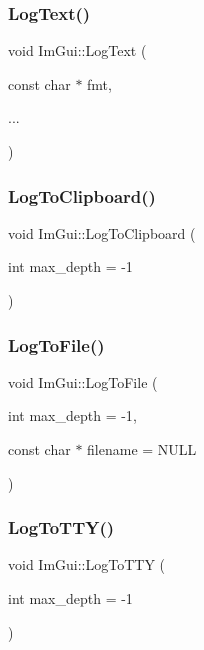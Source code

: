 \subsubsection{\texorpdfstring{Log\+Text()}{LogText()}}
{\footnotesize\ttfamily void Im\+Gui\+::\+Log\+Text (\begin{DoxyParamCaption}\item[{const char $\ast$}]{fmt,  }\item[{}]{... }\end{DoxyParamCaption})}

\hypertarget{namespace_im_gui_a81add991d176834b8a6e315dfc78e4f7}{}\label{namespace_im_gui_a81add991d176834b8a6e315dfc78e4f7} 
\subsubsection{\texorpdfstring{Log\+To\+Clipboard()}{LogToClipboard()}}
{\footnotesize\ttfamily void Im\+Gui\+::\+Log\+To\+Clipboard (\begin{DoxyParamCaption}\item[{int}]{max\+\_\+depth = {\ttfamily -\/1} }\end{DoxyParamCaption})}

\hypertarget{namespace_im_gui_ab62461a65c153b9f40842debef8aa755}{}\label{namespace_im_gui_ab62461a65c153b9f40842debef8aa755} 
\subsubsection{\texorpdfstring{Log\+To\+File()}{LogToFile()}}
{\footnotesize\ttfamily void Im\+Gui\+::\+Log\+To\+File (\begin{DoxyParamCaption}\item[{int}]{max\+\_\+depth = {\ttfamily -\/1},  }\item[{const char $\ast$}]{filename = {\ttfamily NULL} }\end{DoxyParamCaption})}

\hypertarget{namespace_im_gui_a37696f5296f33ae4218f53b40b81cccc}{}\label{namespace_im_gui_a37696f5296f33ae4218f53b40b81cccc} 
\subsubsection{\texorpdfstring{Log\+To\+T\+T\+Y()}{LogToTTY()}}
{\footnotesize\ttfamily void Im\+Gui\+::\+Log\+To\+T\+TY (\begin{DoxyParamCaption}\item[{int}]{max\+\_\+depth = {\ttfamily -\/1} }\end{DoxyParamCaption})}

